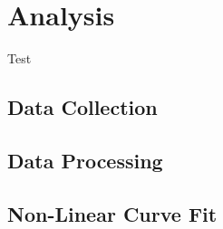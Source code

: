 \section{Analysis}
	\label{sec:Analysis}
	Test

	\subsection{Data Collection}
		\label{subsec:Analysis}

	\subsection{Data Processing}
		\label{subsec:DataProcessing}

	\subsection{Non-Linear Curve Fit}
		\label{subsec:CurveFit}

